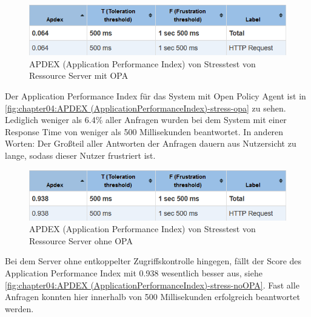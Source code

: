\begin{figure}[htbp]
  \centering
  \includegraphics[width=1.0\textwidth]{gfx/APDEX (Application Performance Index)-stress-opa.png}
  \caption{APDEX (Application Performance Index) von Stresstest von Ressource Server mit OPA}
  \label{fig:chapter04:APDEX (ApplicationPerformanceIndex)-stress-opa}
\end{figure}

Der Application Performance Index für das System mit Open Policy Agent ist in \autoref{fig:chapter04:APDEX (ApplicationPerformanceIndex)-stress-opa} zu sehen. Lediglich weniger als 6.4\% aller Anfragen wurden bei dem System mit einer Response Time von weniger als 500 Millisekunden beantwortet. In anderen Worten: Der Großteil aller Antworten der Anfragen dauern aus Nutzersicht zu lange, sodass dieser Nutzer frustriert ist.

\begin{figure}[htbp]
  \centering
  \includegraphics[width=1.0\textwidth]{gfx/APDEX (Application Performance Index)-stress-noOPA.png}
  \caption{APDEX (Application Performance Index) von Stresstest von Ressource Server ohne OPA}
  \label{fig:chapter04:APDEX (ApplicationPerformanceIndex)-stress-noOPA}
\end{figure}

Bei dem Server ohne entkoppelter Zugriffskontrolle hingegen, fällt der Score des Application Performance Index mit 0.938 wesentlich besser aus, siehe \autoref{fig:chapter04:APDEX (ApplicationPerformanceIndex)-stress-noOPA}. Fast alle Anfragen konnten hier innerhalb von 500 Millisekunden erfolgreich beantwortet werden. 

